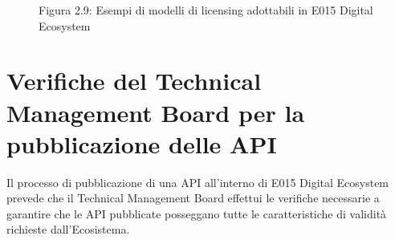 \documentclass[letterpaper,10pt,italian]{sphinxmanual}
\begin{document}
\begin{figure}[htbp]
\centering
\capstart

\noindent{}
\caption{Figura 2.9: Esempi di modelli di licensing adottabili in E015 Digital Ecosystem}\label{\detokenize{sez28:licenze}}\label{\detokenize{sez28:id2}}\end{figure}


\chapter{Verifiche del Technical Management Board per la pubblicazione delle API}
\label{\detokenize{verificheTMB:capitolo3}}\label{\detokenize{verificheTMB::doc}}\label{\detokenize{verificheTMB:verifiche-del-technical-management-board-per-la-pubblicazione-delle-api}}


Il processo di pubblicazione di una API all’interno di E015 Digital Ecosystem prevede che il Technical Management Board effettui le verifiche necessarie a garantire che le API pubblicate posseggano tutte le caratteristiche di validità richieste dall’Ecosistema.
\end{document}
